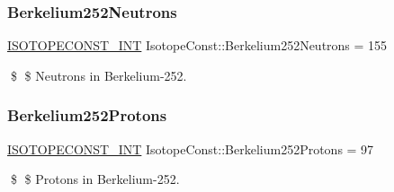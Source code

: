 \subsubsection{\texorpdfstring{Berkelium252\+Neutrons}{Berkelium252Neutrons}}
{\footnotesize\ttfamily \mbox{\hyperlink{group___isotope_const-_macros_ga5f18360b3e99483a35c32d789e62621c}{I\+S\+O\+T\+O\+P\+E\+C\+O\+N\+S\+T\+\_\+\+I\+NT}} Isotope\+Const\+::\+Berkelium252\+Neutrons = 155}

\$ \$ Neutrons in Berkelium-\/252. \mbox{\label{group___isotope_const-_berkelium-_bk252_gaaf2cb323da3a92631e3d10c828d0e1d6}} 
\subsubsection{\texorpdfstring{Berkelium252\+Protons}{Berkelium252Protons}}
{\footnotesize\ttfamily \mbox{\hyperlink{group___isotope_const-_macros_ga5f18360b3e99483a35c32d789e62621c}{I\+S\+O\+T\+O\+P\+E\+C\+O\+N\+S\+T\+\_\+\+I\+NT}} Isotope\+Const\+::\+Berkelium252\+Protons = 97}

\$ \$ Protons in Berkelium-\/252. 